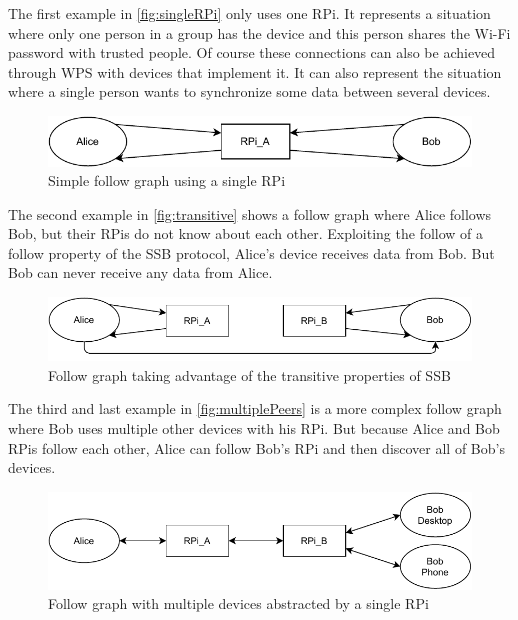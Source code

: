 \documentclass[a4paper,11pt,oneside]{report}
\begin{document}
The first example in \autoref{fig:singleRPi} only uses one RPi. It represents a situation where only one person in a group has the device and this person shares the Wi-Fi password with trusted people. Of course these connections can also be achieved through WPS with devices that implement it. It can also represent the situation where a single person wants to synchronize some data between several devices.

\begin{figure}
  \includegraphics[width=\linewidth]{figures/singleRPi.pdf}
  \caption{Simple follow graph using a single RPi}
  \label{fig:singleRPi}
\end{figure}

The second example in \autoref{fig:transitive} shows a follow graph where Alice follows Bob, but their RPis do not know about each other. Exploiting the follow of a follow property of the SSB protocol, Alice's device receives data from Bob. But Bob can never receive any data from Alice.

\begin{figure}
  \includegraphics[width=\linewidth]{figures/transitive.pdf}
  \caption{Follow graph taking advantage of the transitive properties of SSB}
  \label{fig:transitive}
\end{figure}

The third and last example in \autoref{fig:multiplePeers} is a more complex follow graph where Bob uses multiple other devices with his RPi. But because Alice and Bob RPis follow each other, Alice can follow Bob's RPi and then discover all of Bob's devices.

\begin{figure}
  \includegraphics[width=\linewidth]{figures/complexGraph.pdf}
  \caption{Follow graph with multiple devices abstracted by a single RPi}
  \label{fig:multiplePeers}
\end{figure}
\end{document}
